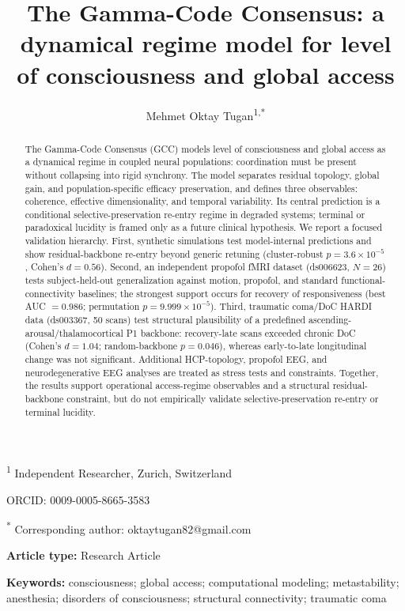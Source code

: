 \documentclass[11pt,a4paper]{article}
\title{%
  \textbf{The Gamma-Code Consensus: a dynamical regime model for level of consciousness and global access}
}
\author{%
  Mehmet Oktay Tugan\textsuperscript{1,*}
}
\date{}
\theoremstyle{plain}
\theoremstyle{definition}
\theoremstyle{remark}
\begin{document}
\maketitle
\thispagestyle{fancy}

\noindent
\textsuperscript{1} Independent Researcher, Zurich, Switzerland

\noindent
ORCID: 0009-0005-8665-3583

\noindent
\textsuperscript{*} Corresponding author: oktaytugan82@gmail.com

\medskip
\noindent\textbf{Article type:} Research Article

\bigskip

\begin{abstract}
\noindent
The Gamma-Code Consensus (GCC) models level of consciousness and global access as a dynamical regime in coupled neural populations: coordination must be present without collapsing into rigid synchrony. The model separates residual topology, global gain, and population-specific efficacy preservation, and defines three observables: coherence, effective dimensionality, and temporal variability. Its central prediction is a conditional selective-preservation re-entry regime in degraded systems; terminal or paradoxical lucidity is framed only as a future clinical hypothesis. We report a focused validation hierarchy. First, synthetic simulations test model-internal predictions and show residual-backbone re-entry beyond generic retuning (cluster-robust $p = 3.6 \times 10^{-5}$, Cohen's $d = 0.56$). Second, an independent propofol fMRI dataset (ds006623, $N = 26$) tests subject-held-out generalization against motion, propofol, and standard functional-connectivity baselines; the strongest support occurs for recovery of responsiveness (best AUC $=0.986$; permutation $p=9.999\times10^{-5}$). Third, traumatic coma/DoC HARDI data (ds003367, 50 scans) test structural plausibility of a predefined ascending-arousal/thalamocortical P1 backbone: recovery-late scans exceeded chronic DoC (Cohen's $d=1.04$; random-backbone $p=0.046$), whereas early-to-late longitudinal change was not significant. Additional HCP-topology, propofol EEG, and neurodegenerative EEG analyses are treated as stress tests and constraints. Together, the results support operational access-regime observables and a structural residual-backbone constraint, but do not empirically validate selective-preservation re-entry or terminal lucidity.
\end{abstract}

\noindent\textbf{Keywords:} consciousness; global access; computational modeling; metastability; anesthesia; disorders of consciousness; structural connectivity; traumatic coma
\end{document}
